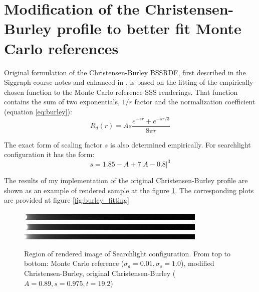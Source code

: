 \section{Modification of the Christensen-Burley profile to better fit Monte
Carlo references}
\label{section:cb_modification}
Original formulation of the Christensen-Burley BSSRDF, first described in the Siggraph course notes
\cite{Burley:disney_siggraph15} and enhanced in \cite{Christensen:2015:ARP:2775280.2792555}, is
based on the fitting of the empirically chosen function to the Monte Carlo reference SSS renderings.
That function contains the sum of two exponentials, $1/r$ factor and the normalization coefficient
(equation \ref{eq:burley}):
\[ R_d(r) = As\dfrac{e^{-sr}+e^{-sr/3}}{8\pi r} \]

The exact form of scaling factor $s$ is also determined empirically. For searchlight configuration 
it has the form:
\begin{equation}
\label{eq:cb_scaling}
s=1.85-A + 7|A - 0.8|^3
\end{equation}

The results of my implementation of the original Christensen-Burley profile are shown as an example
of rendered sample at the figure \ref{fig:burley_searchlight_renders}. The corresponding plots are
provided at figure \ref{fig:burley_fitting}

\begin{figure}[h]
    \centering
    \includegraphics[width=256pt,trim={0 0 256 0},clip]{imgs/renders/cb_montecarlo_slice}
    \includegraphics[width=256pt,trim={0 0 256 0},clip]{imgs/renders/cb_modified_slice}
    \includegraphics[width=256pt,trim={0 0 256 0},clip]{imgs/renders/cb_original_slice}
    \caption{Region of rendered image of Searchlight configuration. From top to bottom: Monte Carlo
    reference ($\sigma_a=0.01, \sigma_s=1.0$), modified Christensen-Burley, original
    Christensen-Burley ($A=0.89, s=0.975, t=19.2$)}
    \label{fig:burley_searchlight_renders}
\end{figure}

